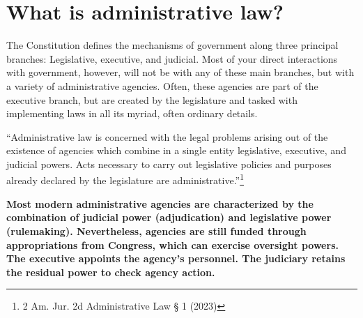 \documentclass[../main.tex]{subfiles}
\begin{document}
    
\section{What is administrative law?}
The Constitution defines the mechanisms of government along three principal branches: Legislative, executive, and judicial. Most of your direct interactions with government, however, will not be with any of these main branches, but with a variety of administrative agencies. Often, these agencies are part of the executive branch, but are created by the legislature and tasked with implementing laws in all its myriad, often ordinary details.

 \enquote{Administrative law is concerned with the legal problems arising out of the existence of agencies which combine in a single entity legislative, executive, and judicial powers. Acts necessary to carry out legislative policies and purposes already declared by the legislature are administrative.}\footnote{2 Am. Jur. 2d Administrative Law § 1 (2023)}

\begin{note}
    \textbf{Most modern administrative agencies are characterized by the combination of judicial power (adjudication) and legislative power (rulemaking). Nevertheless, agencies are still funded through appropriations from Congress, which can exercise oversight powers. The executive appoints the agency's personnel. The judiciary retains the residual power to check agency action.}
\end{note}
\end{document}
